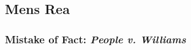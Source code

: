 % 
% 
% 
% 
% 
% 
% 
% 
% 

\subsection{Mens Rea}

\subsubsection{Mistake of Fact: \emph{People v. Williams}}


